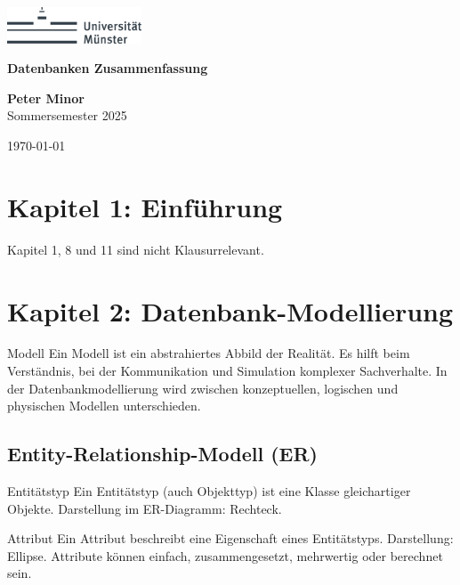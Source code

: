 \documentclass{article}
\begin{document}
\begin{titlepage}
    \centering
    \includegraphics[width=0.3\textwidth]{Uni Logo.png} 
    \vspace*{2cm}
    
    {\Large\bfseries Datenbanken Zusammenfassung\par}
    \vspace{1.5cm}
    
    \textbf{Peter Minor}\\
    Sommersemester 2025
    
    \vfill    
    \vspace{1.5cm}
    {\large \today\par}
\end{titlepage}

\tableofcontents

\newpage
\section{Kapitel 1: Einführung}
Kapitel 1, 8 und 11 sind nicht Klausurrelevant.

\section{Kapitel 2: Datenbank-Modellierung}

\begin{block}{Modell}
Ein Modell ist ein abstrahiertes Abbild der Realität. Es hilft beim Verständnis, bei der Kommunikation und Simulation komplexer Sachverhalte. In der Datenbankmodellierung wird zwischen konzeptuellen, logischen und physischen Modellen unterschieden.
\end{block}

\subsection*{Entity-Relationship-Modell (ER)}

\begin{block}{Entitätstyp}
Ein Entitätstyp (auch Objekttyp) ist eine Klasse gleichartiger Objekte. Darstellung im ER-Diagramm: Rechteck.
\end{block}

\begin{block}{Attribut}
Ein Attribut beschreibt eine Eigenschaft eines Entitätstyps. Darstellung: Ellipse. Attribute können einfach, zusammengesetzt, mehrwertig oder berechnet sein.
\end{block}
\end{document}
